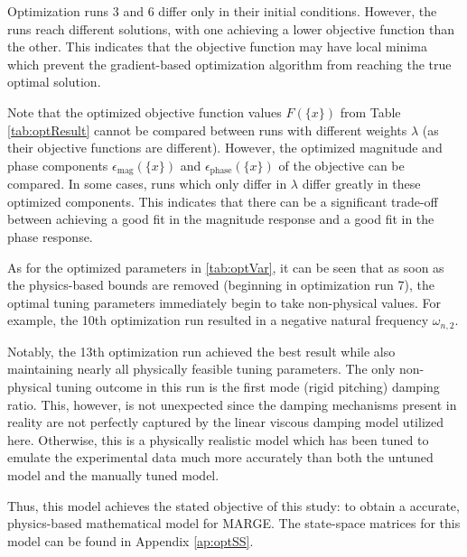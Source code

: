 Optimization runs 3 and 6 differ only in their initial conditions. However, the runs reach different solutions, with one achieving a lower objective function than the other. This indicates that the objective function may have local minima which prevent the gradient-based optimization algorithm from reaching the true optimal solution.

Note that the optimized objective function values $F(\{x\})$ from Table \ref{tab:optResult} cannot be compared between runs with different weights $\lambda$ (as their objective functions are different). However, the optimized magnitude and phase components $\epsilon_\text{mag}(\{x\})$ and $\epsilon_\text{phase}(\{x\})$ of the objective can be compared. In some cases, runs which only differ in $\lambda$ differ greatly in these optimized components. This indicates that there can be a significant trade-off between achieving a good fit in the magnitude response and a good fit in the phase response.

As for the optimized parameters in \ref{tab:optVar}, it can be seen that as soon as the physics-based bounds are removed (beginning in optimization run 7), the optimal tuning parameters immediately begin to take non-physical values. For example, the 10th optimization run resulted in a negative natural frequency $\omega_{n,2}$.

Notably, the 13th optimization run achieved the best result while also maintaining nearly all physically feasible tuning parameters. The only non-physical tuning outcome in this run is the first mode (rigid pitching) damping ratio. This, however, is not unexpected since the damping mechanisms present in reality are not perfectly captured by the linear viscous damping model utilized here. Otherwise, this is a physically realistic model which has been tuned to emulate the experimental data much more accurately than both the untuned model and the manually tuned model.

Thus, this model achieves the stated objective of this study: to obtain a accurate, physics-based mathematical model for MARGE. The state-space matrices for this model can be found in Appendix \ref{ap:optSS}.

%
%
%
%
%
%
%
%
